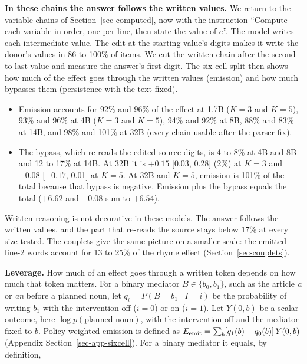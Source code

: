 \documentclass[
]{article}
\providecommand{\tightlist}{%
  \setlength{\itemsep}{0pt}\setlength{\parskip}{0pt}}
\begin{document}
\textbf{In these chains the answer follows the written values.} We
return to the variable chains of Section~\ref{sec-computed}, now with
the instruction ``Compute each variable in order, one per line, then
state the value of \(e\)''. The model writes each intermediate value.
The edit at the starting value's digits makes it write the donor's
values in 86 to 100\% of items. We cut the written chain after the
second-to-last value and measure the answer's first digit. The six-cell
split then shows how much of the effect goes through the written values
(emission) and how much bypasses them (persistence with the text fixed).

\begin{itemize}
\tightlist
\item
  Emission accounts for 92\% and 96\% of the effect at 1.7B (\(K=3\) and
  \(K=5\)), 93\% and 96\% at 4B (\(K=3\) and \(K=5\)), 94\% and 92\% at
  8B, 88\% and 83\% at 14B, and 98\% and 101\% at 32B (every chain
  usable after the parser fix).
\item
  The bypass, which re-reads the edited source digits, is 4 to 8\% at 4B
  and 8B and 12 to 17\% at 14B. At 32B it is \(+0.15\) {[}0.03, 0.28{]}
  (2\%) at \(K=3\) and \(-0.08\) {[}\(-0.17\), 0.01{]} at \(K=5\). At
  32B and \(K=5\), emission is 101\% of the total because that bypass is
  negative. Emission plus the bypass equals the total (\(+6.62\) and
  \(-0.08\) sum to \(+6.54\)).
\end{itemize}

Written reasoning is not decorative in these models. The answer follows
the written values, and the part that re-reads the source stays below
17\% at every size tested. The couplets give the same picture on a
smaller scale: the emitted line-2 words account for 13 to 25\% of the
rhyme effect (Section~\ref{sec-couplets}).

\textbf{Leverage.} How much of an effect goes through a written token
depends on how much that token matters. For a binary mediator
\(B\in\{b_0,b_1\}\), such as the article \emph{a} or \emph{an} before a
planned noun, let \(q_i=P(B=b_1\mid I=i)\) be the probability of writing
\(b_1\) with the intervention off (\(i=0\)) or on (\(i=1\)). Let
\(Y(0,b)\) be a scalar outcome, here \(\log p(\text{planned noun})\),
with the intervention off and the mediator fixed to \(b\).
Policy-weighted emission is defined as
\(E_{\rm emit}=\sum_b [q_1(b)-q_0(b)]\,Y(0,b)\) (Appendix
Section~\ref{sec-app-sixcell}). For a binary mediator it equals, by
definition,
\end{document}

